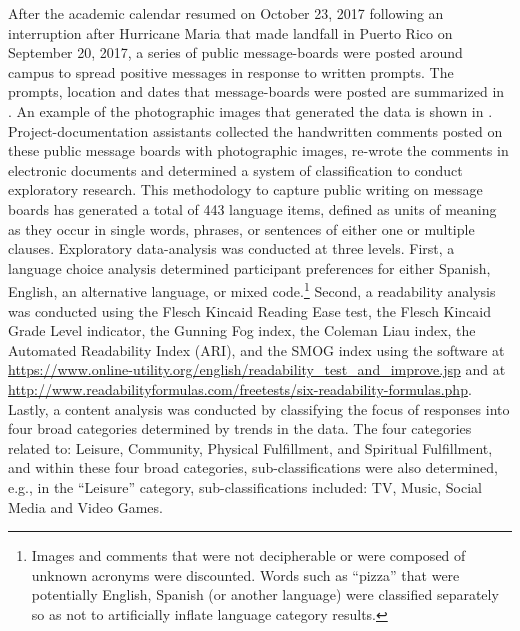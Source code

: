 \documentclass[output=paper,colorlinks,citecolor=brown]{langscibook}
\begin{document}
\begin{sloppypar}
After the academic calendar resumed on October 23, 2017 following an interruption after Hurricane Maria that made landfall in Puerto Rico on September 20, 2017, a series of public message-boards were posted around campus to spread positive messages in response to written prompts. The prompts, location and dates that message-boards were posted are summarized in . An example of the photographic images that generated the data is shown in . Project-documentation assistants collected the handwritten comments posted on these public message boards with photographic images, re-wrote the comments in electronic documents and determined a system of classification to conduct exploratory research. This methodology to capture public writing on message boards has generated a total of 443 language items, defined as units of meaning as they occur in single words, phrases, or sentences of either one or multiple clauses. Exploratory data-analysis was conducted at three levels. First, a language choice analysis determined participant preferences for either Spanish, English, an alternative language, or mixed code.\footnote{Images and comments that were not decipherable or were composed of unknown acronyms were discounted. Words such as “pizza” that were potentially English, Spanish (or another language) were classified separately so as not to artificially inflate language category results.} Second, a readability analysis was conducted using the Flesch Kincaid Reading Ease test, the Flesch Kincaid Grade Level indicator, the Gunning Fog index, the Coleman Liau index, the Automated Readability Index (ARI), and the SMOG index using the software at \url{https://www.online-utility.org/english/readability\_test\_and\_improve.jsp} and at \url{http://www.readabilityformulas.com/freetests/six-readability-formulas.php}. Lastly, a content analysis was conducted by classifying the focus of responses into four broad categories determined by trends in the data. The four categories related to: Leisure, Community, Physical Fulfillment, and Spiritual Fulfillment, and within these four broad categories, sub-classifications were also determined, e.g., in the “Leisure” category, sub-classifications included: TV, Music, Social Media and Video Games.
\end{sloppypar}
\end{document}
